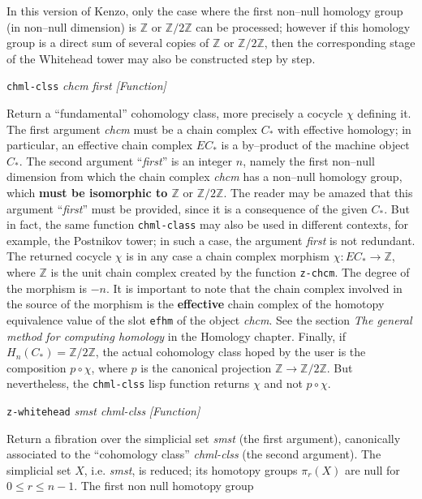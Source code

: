 In this version of Kenzo, only the case where the first non--null
homology group (in non--null dimension) is $\mathbb{Z}$ or $\mathbb{Z}/{2 \mathbb{Z}}$ can be processed; however if this
homology group is a direct sum of several copies of $\mathbb{Z}$ or $\mathbb{Z}/{2 \mathbb{Z}}$, then the corresponding
stage of the Whitehead tower may also be constructed step by step.
\vskip 0.35cm
{\parindent=0mm
{\leftskip=5mm
{\tt chml-clss} {\em chcm first}  \hfill {\em [Function]} \par}
{\leftskip=15mm
Return a ``fundamental'' cohomology class, more precisely a cocycle $\chi$ defining it.
The first argument {\em chcm} must be a chain complex $C_*$ with effective homology; in particular,
an effective chain complex $EC_*$ is a by--product of the machine object $C_*$. The second argument ``{\em first}''
is an integer $n$, namely the first non--null dimension from which the chain complex
{\em chcm} has a non--null homology group, which {\bf must be isomorphic to $\mathbb{Z}$} or $\mathbb{Z}/{2 \mathbb{Z}}$.
The reader may be amazed that this argument ``{\em first}'' must be provided, since it is  a consequence
of the given $C_*$. But in fact, the same function {\tt chml-class} may also be used in different contexts, for example,
the Postnikov tower; in such a case, the argument {\em first} is not redundant. The returned cocycle $\chi$
is in any case a chain complex morphism $\chi: EC_* \longrightarrow \mathbb{Z}$, where $\mathbb{Z}$ is the unit chain complex
created by the function {\tt z-chcm}. The degree of the morphism is $- n$.
It is important to note that  the chain complex involved in the source of the morphism
is the {\bf effective} chain complex of the homotopy equivalence value of the slot {\tt efhm} of
the object {\em chcm}. See the section {\em The general method for computing homology} in the Homology chapter.
Finally, if $H_n(C_*)=\mathbb{Z}/{2 \mathbb{Z}}$, the actual cohomology class hoped by the user is the composition
$p \circ \chi$, where $p$ is the canonical projection $\mathbb{Z} \longrightarrow \mathbb{Z}/{2 \mathbb{Z}}$. But nevertheless,
the {\tt chml-clss} lisp function returns $\chi$ and not $p \circ \chi$.
\par}
{\leftskip=5mm
{\tt z-whitehead} {\em smst chml-clss}  \hfill {\em [Function]} \par}
{\leftskip=15mm
Return a fibration  over the simplicial set {\em smst} (the first argument), canonically associated
to the ``cohomology class'' {\em chml-clss} (the second argument). The simplicial set $X$, i.e. {\em smst}, is
reduced; its homotopy groups $\pi_r(X)$ are null for $0 \leq r \leq n-1$. The first non null homotopy group
}}

